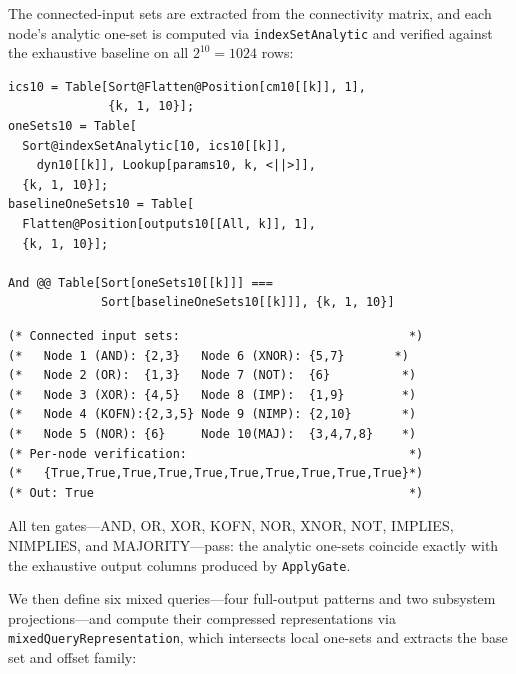 \documentclass[11pt]{article}
\begin{document}
The connected-input sets are extracted from the connectivity matrix, and
each node's analytic one-set is computed via \texttt{indexSetAnalytic} and
verified against the exhaustive baseline on all $2^{10}=1024$ rows:

\begin{lstlisting}[style=MathematicaStyle,caption={Per-node verification against exhaustive baseline.}]
ics10 = Table[Sort@Flatten@Position[cm10[[k]], 1],
              {k, 1, 10}];
oneSets10 = Table[
  Sort@indexSetAnalytic[10, ics10[[k]],
    dyn10[[k]], Lookup[params10, k, <||>]],
  {k, 1, 10}];
baselineOneSets10 = Table[
  Flatten@Position[outputs10[[All, k]], 1],
  {k, 1, 10}];

And @@ Table[Sort[oneSets10[[k]]] ===
             Sort[baselineOneSets10[[k]]], {k, 1, 10}]
\end{lstlisting}
\begin{lstlisting}[style=MathematicaOutput]
(* Connected input sets:                                *)
(*   Node 1 (AND): {2,3}   Node 6 (XNOR): {5,7}       *)
(*   Node 2 (OR):  {1,3}   Node 7 (NOT):  {6}          *)
(*   Node 3 (XOR): {4,5}   Node 8 (IMP):  {1,9}        *)
(*   Node 4 (KOFN):{2,3,5} Node 9 (NIMP): {2,10}       *)
(*   Node 5 (NOR): {6}     Node 10(MAJ):  {3,4,7,8}    *)
(* Per-node verification:                               *)
(*   {True,True,True,True,True,True,True,True,True,True}*)
(* Out: True                                            *)
\end{lstlisting}

All ten gates---AND, OR, XOR, KOFN, NOR, XNOR, NOT, IMPLIES, NIMPLIES,
and MAJORITY---pass: the analytic one-sets coincide exactly with the
exhaustive output columns produced by \texttt{ApplyGate}.

We then define six mixed queries---four full-output patterns and two
subsystem projections---and compute their compressed representations
via \texttt{mixedQueryRepresentation}, which intersects local one-sets
and extracts the base set and offset family:
\end{document}
